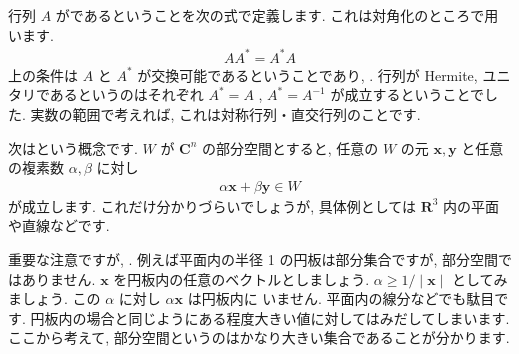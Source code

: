 \documentclass[openany, a4paper, oneside]{jsbook}
\begin{document}
行列 $A$ がであるということを次の式で定義します.
これは対角化のところで用います.
\begin{align}
    AA^{*} = A^{*}A
\end{align}
上の条件は $A$ と $A^{*}$ が交換可能であるということであり, .
行列が Hermite, ユニタリであるというのはそれぞれ $A^{*}=A$ ,  $A^{*} = A^{-1}$ が成立するということでした.
実数の範囲で考えれば, これは対称行列・直交行列のことです.

次はという概念です.
 $W$ が $\bm{C}^n$ の部分空間とすると,
任意の $W$ の元 $\bm{x},\bm{y}$ と任意の複素数 $\alpha,\beta$ に対し
\begin{align}
    \alpha \bm{x} + \beta \bm{y} \in W
\end{align}
が成立します. これだけ分かりづらいでしょうが, 具体例としては $\bm{R}^3$ 内の平面や直線などです.

重要な注意ですが, .
例えば平面内の半径 1 の円板は部分集合ですが, 部分空間ではありません.
 $\bm{x}$ を円板内の任意のベクトルとしましょう.
 $\alpha \geq 1/\mid \bm{x} \mid$ としてみましょう. この $\alpha$ に対し $\alpha \bm{x}$ は円板内に
いません. 平面内の線分などでも駄目です. 円板内の場合と同じようにある程度大きい値に対してはみだしてしまいます.
ここから考えて, 部分空間というのはかなり大きい集合であることが分かります.
\end{document}
